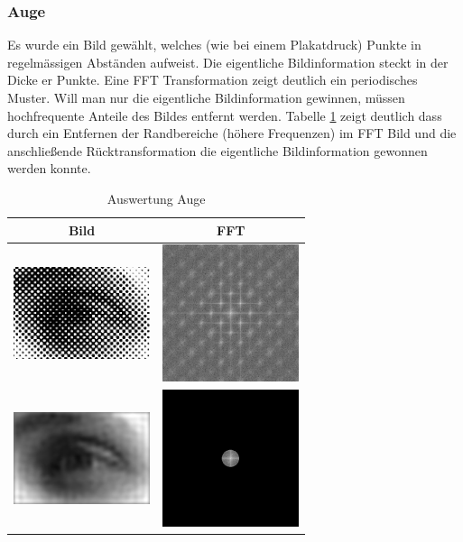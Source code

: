 \documentclass[12pt,german]{article}
\begin{document}
\subsubsection{Auge}
Es wurde ein Bild gewählt, welches (wie bei einem Plakatdruck) Punkte in regelmässigen Abständen aufweist. Die eigentliche Bildinformation steckt in der Dicke er Punkte. Eine FFT Transformation zeigt deutlich ein periodisches Muster. Will man nur die eigentliche Bildinformation gewinnen, müssen hochfrequente Anteile des Bildes entfernt werden. Tabelle \ref{tab:AuswertungAuge} zeigt deutlich dass durch ein Entfernen der Randbereiche (höhere Frequenzen) im FFT Bild und die anschließende Rücktransformation die eigentliche Bildinformation gewonnen werden konnte.
\begin{table}[h]
  \centering
  \begin{tabular}{c | c}
    \hline
    Bild & FFT \\
    \hline
	\includegraphics[width=4cm]{../testData/Auge.jpg} & \includegraphics[width=4cm]{../testData/Results/Auge/FFT_of_Auge.jpg} \\
    \hline
    \includegraphics[width=4cm]{../testData/Results/Auge/reduced_Auge.jpg} & \includegraphics[width=4cm]{../testData/Results/Auge/reduced_FFT_of_Auge.jpg} \\
  \end{tabular}
  \caption{Auswertung Auge}
  \label{tab:AuswertungAuge}
\end{table}
\end{document}
